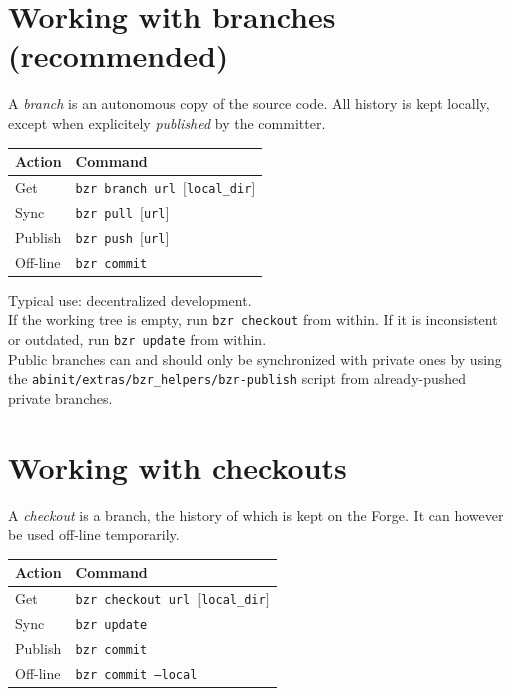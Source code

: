 \documentclass[tumble,foldmark,a4paper]{leaflet}
\begin{document}
\section*{Working with branches (recommended)}

A \textit{branch} is an autonomous copy of the source code. All history
is kept locally, except when explicitely \textit{published} by the
committer.

\vspace{-0.5em}

\begin{center}
 \begin{tabular}{l l}
  \textbf{Action} & \textbf{Command} \\
  \hline
  Get & \texttt{bzr branch url $[$local\_dir$]$} \\
  Sync & \texttt{bzr pull $[$url$]$} \\
  Publish & \texttt{bzr push $[$url$]$} \\
  Off-line & \texttt{bzr commit} \\
 \end{tabular}
\end{center}

Typical use: decentralized development. \\

If the working tree is empty, run \texttt{bzr~checkout} from within. If
it is inconsistent or outdated, run \texttt{bzr~update} from within. \\

Public branches can and should only be synchronized with private ones by
using the \texttt{\texttildelow{}abinit/extras/bzr\_helpers/bzr-publish}
script from already-pushed private branches.

\section*{Working with checkouts}

A \textit{checkout} is a branch, the history of which is kept on the
Forge. It can however be used off-line temporarily.

\vspace{-0.5em}

\begin{center}
 \begin{tabular}{l l}
  \textbf{Action} & \textbf{Command} \\
  \hline
  Get & \texttt{bzr checkout url $[$local\_dir$]$} \\
  Sync & \texttt{bzr update} \\
  Publish & \texttt{bzr commit} \\
  Off-line & \texttt{bzr commit --local} \\
 \end{tabular}
\end{center}
\end{document}
